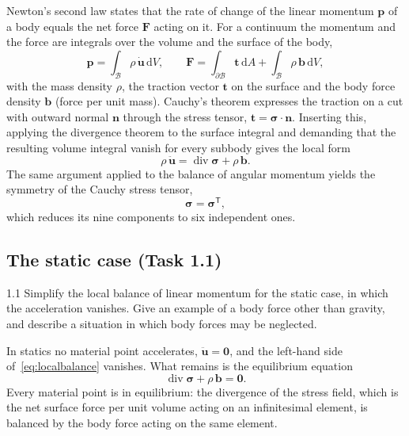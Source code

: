 \documentclass[11pt,a4paper]{article}
\numberwithin{equation}{section}
\theoremstyle{remark}
\newcommand{\dv}{\operatorname{div}}
\newcommand{\bu}{\bm{u}}
\newcommand{\bt}{\bm{t}}
\newcommand{\bn}{\bm{n}}
\newcommand{\bb}{\bm{b}}
\newcommand{\bsig}{\bm{\sigma}}
\begin{document}
Newton's second law states that the rate of change of the linear momentum $\bm{p}$ of a
body equals the net force $\bm{F}$ acting on it. For a continuum the momentum and the
force are integrals over the volume and the surface of the body,
\begin{equation}\label{eq:integralbalance}
  \bm{p} = \int_{\mathcal{B}} \rho\,\dot{\bu}\,\mathrm{d}V,
  \qquad
  \bm{F} = \int_{\partial\mathcal{B}} \bt\,\mathrm{d}A + \int_{\mathcal{B}} \rho\,\bb\,\mathrm{d}V,
\end{equation}
with the mass density $\rho$, the traction vector $\bt$ on the surface and the body force
density $\bb$ (force per unit mass). Cauchy's theorem expresses the traction on a cut with
outward normal $\bn$ through the stress tensor, $\bt = \bsig\cdot\bn$. Inserting this,
applying the divergence theorem to the surface integral and demanding that the resulting
volume integral vanish for every subbody gives the local form
\begin{equation}\label{eq:localbalance}
  \rho\,\ddot{\bu} = \dv\bsig + \rho\,\bb.
\end{equation}
The same argument applied to the balance of angular momentum yields the symmetry of the
Cauchy stress tensor,
\begin{equation}\label{eq:sigmasym}
  \bsig = \bsig^{\mathsf{T}},
\end{equation}
which reduces its nine components to six independent ones.

\subsection{The static case (Task 1.1)}\label{sec:statics}

\begin{task}{1.1}
  Simplify the local balance of linear momentum for the static case, in which the
  acceleration vanishes. Give an example of a body force other than gravity, and describe
  a situation in which body forces may be neglected.
\end{task}

In statics no material point accelerates, $\ddot{\bu} = \bm{0}$, and the left-hand side
of~\eqref{eq:localbalance} vanishes. What remains is the equilibrium equation
\begin{equation}\label{eq:equilibrium}
  \boxed{\;\dv\bsig + \rho\,\bb = \bm{0}.\;}
\end{equation}
Every material point is in equilibrium: the divergence of the stress field, which is the
net surface force per unit volume acting on an infinitesimal element, is balanced by the
body force acting on the same element.
\end{document}
